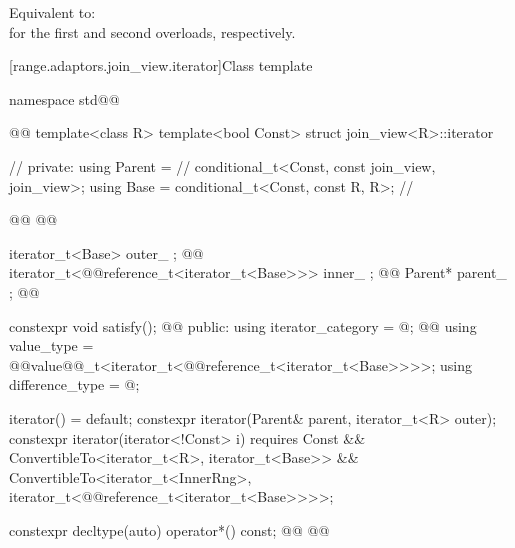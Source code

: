 {\begin{itemdescr}
\pnum
\effects Equivalent to:
 \\
for the first and second overloads, respectively.
\end{itemdescr}

[range.adaptors.join_view.iterator]{Class template }

\pnum
{}

\begin{codeblock}
namespace std@@ { @@
template<class R>
  template<bool Const>
  struct join_view<R>::iterator { // \expos
  private:
    using Parent =                                            // \expos
      conditional_t<Const, const join_view, join_view>;
    using Base   = conditional_t<Const, const R, R>;          // \expos

    @@
      @@

    iterator_t<Base> outer_ {};                               @\newtxt{// \expos}@
    iterator_t<@@reference_t<iterator_t<Base>>> inner_ {}; @\newtxt{// \expos}@
    Parent* parent_ {};                                       @\newtxt{// \expos}@

    constexpr void satisfy();                                 @\newtxt{// \expos}@
  public:
    using iterator_category = @\seebelownc@;
    @@
    using value_type = @@value@@_t<iterator_t<@@reference_t<iterator_t<Base>>>>;
    using difference_type = @\seebelownc@;

    iterator() = default;
    constexpr iterator(Parent& parent, iterator_t<R> outer);
    constexpr iterator(iterator<!Const> i) requires Const &&
      ConvertibleTo<iterator_t<R>, iterator_t<Base>> &&
      ConvertibleTo<iterator_t<InnerRng>,
        iterator_t<@@reference_t<iterator_t<Base>>>>;

    constexpr decltype(auto) operator*() const;
    @@
      @@

}}
\end{codeblock}}
